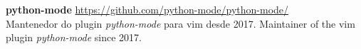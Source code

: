 \documentclass[]{friggeri-cv}
\begin{document}
\begin{entrylist}
{    }
\end{entrylist}%
%
%
\textbf{python-mode} \hfill \small{\href{https://github.com/python-mode/python-mode}{https://github.com/python-mode/python-mode/}}\\
\small{%
{Mantenedor do plugin \emph{python-mode} para vim desde 2017.}%
{Maintainer of the vim plugin \emph{python-mode} since 2017.}}\\
\end{document}
